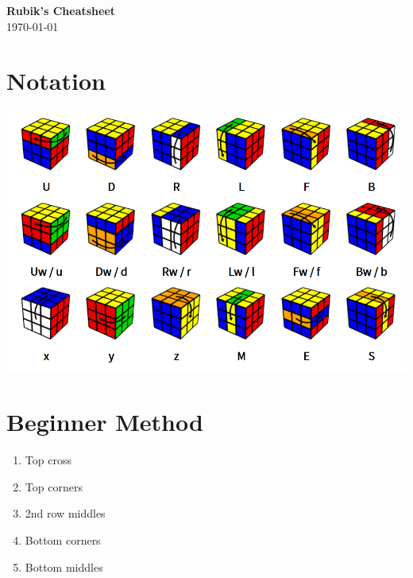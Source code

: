 \documentclass[10pt,landscape]{cheatsheet}
\begin{document}
\footnotesize
\begin{multicols}{3}

\begin{center}
     \Large{\textbf{Rubik's Cheatsheet}}\\
     \scriptsize{\today}
\end{center}

\section{Notation}
\begin{Figure}
    \centering
    \includegraphics[width=\linewidth]{img/notation.png}
    \label{fig:notation}
\end{Figure}


\section{Beginner Method}

\begin{enumerate}
    \item Top cross
    \item Top corners
    \item 2nd row middles
    \item Bottom corners
    \item Bottom middles
\end{enumerate}


\end{multicols}
\end{document}
